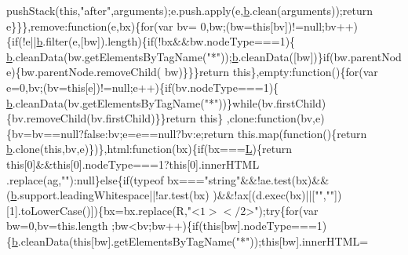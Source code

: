 \begin{DoxyCode}
      pushStack(\textcolor{keyword}{this},\textcolor{stringliteral}{"after"},arguments);e.push.apply(e,\hyperlink{jquery_8js_aa4026ad5544b958e54ce5e106fa1c805}{b}.clean(arguments));\textcolor{keywordflow}{return} e\}\}\},\textcolor{keyword}{remove}:\textcolor{keyword}{function}(e,bx)\{\textcolor{keywordflow}{for}(var bv=
      0,bw;(bw=\textcolor{keyword}{this}[bv])!=null;bv++)\{\textcolor{keywordflow}{if}(!e||\hyperlink{jquery_8js_aa4026ad5544b958e54ce5e106fa1c805}{b}.filter(e,[bw]).length)\{\textcolor{keywordflow}{if}(!bx&&bw.nodeType===1)\{
      \hyperlink{jquery_8js_aa4026ad5544b958e54ce5e106fa1c805}{b}.cleanData(bw.getElementsByTagName(\textcolor{stringliteral}{"*"}));\hyperlink{jquery_8js_aa4026ad5544b958e54ce5e106fa1c805}{b}.cleanData([bw])\}\textcolor{keywordflow}{if}(bw.parentNode)\{bw.parentNode.removeChild(
      bw)\}\}\}\textcolor{keywordflow}{return} \textcolor{keyword}{this}\},empty:\textcolor{keyword}{function}()\{\textcolor{keywordflow}{for}(var e=0,bv;(bv=\textcolor{keyword}{this}[e])!=null;e++)\{\textcolor{keywordflow}{if}(bv.nodeType===1)\{
      \hyperlink{jquery_8js_aa4026ad5544b958e54ce5e106fa1c805}{b}.cleanData(bv.getElementsByTagName(\textcolor{stringliteral}{"*"}))\}\textcolor{keywordflow}{while}(bv.firstChild)\{bv.removeChild(bv.firstChild)\}\}\textcolor{keywordflow}{return} \textcolor{keyword}{this}\}
      ,clone:\textcolor{keyword}{function}(bv,e)\{bv=bv==null?\textcolor{keyword}{false}:bv;e=e==null?bv:e;\textcolor{keywordflow}{return} this.map(\textcolor{keyword}{function}()\{\textcolor{keywordflow}{return} 
      \hyperlink{jquery_8js_aa4026ad5544b958e54ce5e106fa1c805}{b}.clone(\textcolor{keyword}{this},bv,e)\})\},html:\textcolor{keyword}{function}(bx)\{\textcolor{keywordflow}{if}(bx===\hyperlink{jquery_8js_a38ee4c0b5f4fe2a18d0c783af540d253}{L})\{\textcolor{keywordflow}{return} \textcolor{keyword}{this}[0]&&\textcolor{keyword}{this}[0].nodeType===1?\textcolor{keyword}{this}[0].innerHTML
      .replace(ag,\textcolor{stringliteral}{""}):null\}\textcolor{keywordflow}{else}\{\textcolor{keywordflow}{if}(typeof bx===\textcolor{stringliteral}{"string"}&&!ae.test(bx)&&(\hyperlink{jquery_8js_aa4026ad5544b958e54ce5e106fa1c805}{b}.support.leadingWhitespace||!ar.test(bx)
      )&&!ax[(d.exec(bx)||[\textcolor{stringliteral}{""},\textcolor{stringliteral}{""}])[1].toLowerCase()])\{bx=bx.replace(R,\textcolor{stringliteral}{"<$1></$2>"});\textcolor{keywordflow}{try}\{\textcolor{keywordflow}{for}(var bw=0,bv=this.length
      ;bw<bv;bw++)\{\textcolor{keywordflow}{if}(\textcolor{keyword}{this}[bw].nodeType===1)\{\hyperlink{jquery_8js_aa4026ad5544b958e54ce5e106fa1c805}{b}.cleanData(\textcolor{keyword}{this}[bw].getElementsByTagName(\textcolor{stringliteral}{"*"}));\textcolor{keyword}{this}[bw].innerHTML=

\end{DoxyCode}
